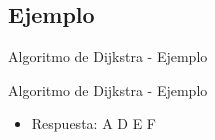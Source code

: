 \documentclass[handout]{beamer} %
\begin{document}
\subsection{Ejemplo}
\begin{frame}{Algoritmo de Dijkstra - Ejemplo}
\end{frame}

\begin{frame}{Algoritmo de Dijkstra - Ejemplo}

\begin{itemize}
  \item Respuesta:  A \rightarrow D \rightarrow E \rightarrow F
\end{itemize}
\end{frame}
\end{document}
